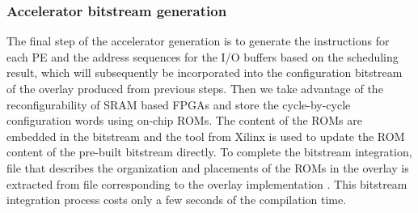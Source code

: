 \subsubsection{Accelerator bitstream generation}
The final step of the accelerator generation is to generate 
the instructions for each PE and the address sequences for the 
I/O buffers based on the scheduling result, which will subsequently 
be incorporated into the configuration bitstream of the overlay produced 
from previous steps. Then we take advantage of the reconfigurability 
of SRAM based FPGAs and store the cycle-by-cycle configuration words 
using on-chip ROMs. The content of the ROMs are embedded in the 
bitstream and the  tool from Xilinx \cite{data2mem} is 
used to update the ROM content of the pre-built bitstream directly. 
To complete the bitstream integration,  file that describes 
the organization and placements of the ROMs in the overlay is extracted 
from  file corresponding to the overlay implementation \cite{beckhoff2011xilinx}.
This bitstream integration process costs only a few seconds of the compilation time.
